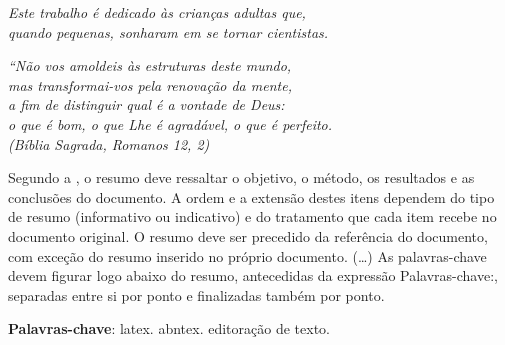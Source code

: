 \begin{dedicatoria}
   \vspace*{\fill}
   \centering
   \noindent
   \textit{ Este trabalho é dedicado às crianças adultas que,\\
     quando pequenas, sonharam em se tornar cientistas.}
   \vspace*{\fill}
\end{dedicatoria}

\begin{agradecimentos}
  \lipsum[1]

\end{agradecimentos}

\begin{epigrafe}
  \vspace*{\fill}
  \begin{flushright}
    \textit{``Não vos amoldeis às estruturas deste mundo, \\
      mas transformai-vos pela renovação da mente, \\
      a fim de distinguir qual é a vontade de Deus: \\
      o que é bom, o que Lhe é agradável, o que é perfeito.\\
      (Bíblia Sagrada, Romanos 12, 2)}
  \end{flushright}
\end{epigrafe}


\setlength{\absparsep}{18pt} %
\begin{resumo}
  Segundo a , o resumo deve
  ressaltar o objetivo, o método, os resultados e as conclusões do
  documento. A ordem e a extensão destes itens dependem do tipo de
  resumo (informativo ou indicativo) e do tratamento que cada item
  recebe no documento original. O resumo deve ser precedido da
  referência do documento, com exceção do resumo inserido no próprio
  documento. (\ldots) As palavras-chave devem figurar logo abaixo do
  resumo, antecedidas da expressão Palavras-chave:, separadas entre si
  por ponto e finalizadas também por ponto.

 \textbf{Palavras-chave}: latex. abntex. editoração de texto.
\end{resumo}

